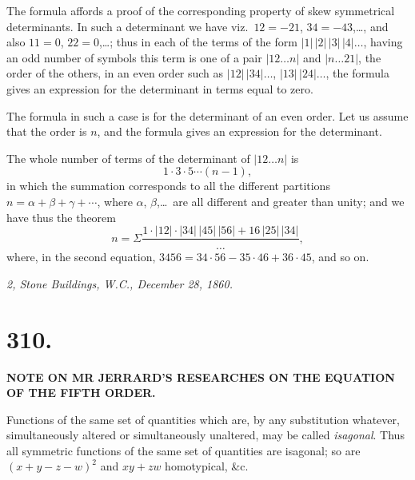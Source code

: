 \documentclass[11pt,a4paper]{article}
\begin{document}
\medskip

The formula affords a proof of the corresponding property of skew symmetrical determinants. In such a determinant we have viz.\ $12=-21$, $34=-43$,\ldots, and also $11=0$, $22=0$,\ldots; thus in each of the terms of the form $|1|\,|2|\,|3|\,|4|\ldots$, having an odd number of symbols this term is one of a pair $|12\ldots n|$ and $|n\ldots 21|$, the order of the others, in an even order such as $|12|\,|34|\ldots$, $|13|\,|24|\ldots$, the formula gives an expression for the determinant in terms equal to zero.

\medskip

The formula in such a case is for the determinant of an even order. Let us assume that the order is $n$, and the formula gives an expression for the determinant.

\medskip

The whole number of terms of the determinant of $|12\ldots n|$ is
\[
1\cdot 3\cdot 5\cdots(n-1),
\]
in which the summation corresponds to all the different partitions $n=\alpha+\beta+\gamma+\cdots$, where $\alpha$, $\beta$,\ldots\ are all different and greater than unity; and we have thus the theorem
\[
n=\Sigma\frac{1\cdot|12|\cdot|34|\,|45|\,|56|+16\,|25|\,|34|}{\ldots},
\]
where, in the second equation, $3456=34\cdot 56-35\cdot 46+36\cdot 45$, and so on.

\medskip

\hfill\textit{2, Stone Buildings, W.C., December 28, 1860.}
\clearpage

\section*{310.}

\begin{center}
\textbf{NOTE ON MR JERRARD'S RESEARCHES ON THE EQUATION\\OF THE FIFTH ORDER.}
\end{center}

\bigskip


\bigskip

\noindent Functions of the same set of quantities which are, by any substitution whatever, simultaneously altered or simultaneously unaltered, may be called \textit{isagonal}. Thus all symmetric functions of the same set of quantities are isagonal; so are $(x+y-z-w)^2$ and $xy+zw$ homotypical, \&c.
\end{document}
